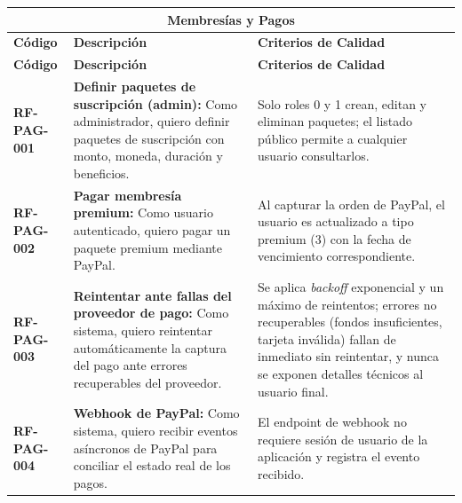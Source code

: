 \begin{longtable}{|l||p{7cm}|p{4.5cm}|}

\multicolumn{3}{c}{Membresías y Pagos}\\
\hline\hline
\textbf{Código} & \textbf{Descripción} & \textbf{Criterios de Calidad}\\
\hline
\endfirsthead
\textbf{Código} & \textbf{Descripción} & \textbf{Criterios de Calidad}\\
\hline\hline
\endhead

\textbf{RF-PAG-001} & \textbf{Definir paquetes de suscripción (admin):} Como administrador, quiero definir paquetes de suscripción con monto, moneda, duración y beneficios. & Solo roles 0 y 1 crean, editan y eliminan paquetes; el listado público permite a cualquier usuario consultarlos. \\
\hline
\textbf{RF-PAG-002} & \textbf{Pagar membresía premium:} Como usuario autenticado, quiero pagar un paquete premium mediante PayPal. & Al capturar la orden de PayPal, el usuario es actualizado a tipo premium (3) con la fecha de vencimiento correspondiente. \\
\hline
\textbf{RF-PAG-003} & \textbf{Reintentar ante fallas del proveedor de pago:} Como sistema, quiero reintentar automáticamente la captura del pago ante errores recuperables del proveedor. & Se aplica \textit{backoff} exponencial y un máximo de reintentos; errores no recuperables (fondos insuficientes, tarjeta inválida) fallan de inmediato sin reintentar, y nunca se exponen detalles técnicos al usuario final. \\
\hline
\textbf{RF-PAG-004} & \textbf{Webhook de PayPal:} Como sistema, quiero recibir eventos asíncronos de PayPal para conciliar el estado real de los pagos. & El endpoint de webhook no requiere sesión de usuario de la aplicación y registra el evento recibido. \\
\hline
\end{longtable}

